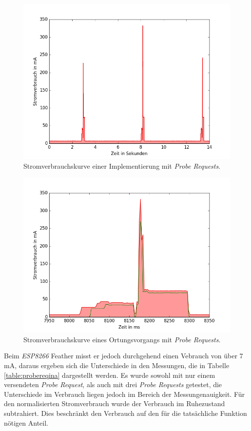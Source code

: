 \begin{figure}[h!]
  \centering
	\includegraphics[width=\textwidth]{plots/probereqfull.png}
  \caption{Stromverbrauchskurve einer Implementierung mit \emph{Probe Requests}.}
  \label{fig:probereqfull}
\end{figure}

\begin{figure}[h!]
  \centering
	\includegraphics[width=\textwidth]{plots/probereqv.png}
  \caption{Stromverbrauchskurve eines Ortungsvorgangs mit \emph{Probe Requests}.}
  \label{fig:probereqv}
\end{figure}

Beim \emph{ESP8266} Feather misst er jedoch durchgehend einen Vebrauch von über 7 mA, daraus ergeben sich die Unterschiede in den Messungen, die in Tabelle \ref{table:probereqina} dargestellt werden.
Es wurde sowohl mit nur einem versendeten \emph{Probe Request}, als auch mit drei \emph{Probe Requests} getestet, die Unterschiede im Verbrauch liegen jedoch im Bereich der Messungenauigkeit.
Für den normalisierten Stromverbrauch wurde der Verbrauch im Ruhezustand subtrahiert. 
Dies beschränkt den Verbrauch auf den für die tatsächliche Funktion nötigen Anteil.

